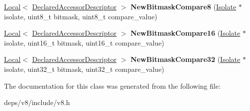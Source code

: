 \begin{DoxyCompactItemize}
\item 
\hypertarget{classv8_1_1_raw_operation_descriptor_a02b9ebd9141b942ee5eaf844837b5a54}{}\hyperlink{classv8_1_1_local}{Local}$<$ \hyperlink{classv8_1_1_declared_accessor_descriptor}{Declared\+Accessor\+Descriptor} $>$ {\bfseries New\+Bitmask\+Compare8} (\hyperlink{classv8_1_1_isolate}{Isolate} $\ast$isolate, uint8\+\_\+t bitmask, uint8\+\_\+t compare\+\_\+value)\label{classv8_1_1_raw_operation_descriptor_a02b9ebd9141b942ee5eaf844837b5a54}

\item 
\hypertarget{classv8_1_1_raw_operation_descriptor_a36f50eb26b4e4fc689d3e77a3a60484d}{}\hyperlink{classv8_1_1_local}{Local}$<$ \hyperlink{classv8_1_1_declared_accessor_descriptor}{Declared\+Accessor\+Descriptor} $>$ {\bfseries New\+Bitmask\+Compare16} (\hyperlink{classv8_1_1_isolate}{Isolate} $\ast$isolate, uint16\+\_\+t bitmask, uint16\+\_\+t compare\+\_\+value)\label{classv8_1_1_raw_operation_descriptor_a36f50eb26b4e4fc689d3e77a3a60484d}

\item 
\hypertarget{classv8_1_1_raw_operation_descriptor_a4dc21ff1a6b8463c1c85db8362bb56a3}{}\hyperlink{classv8_1_1_local}{Local}$<$ \hyperlink{classv8_1_1_declared_accessor_descriptor}{Declared\+Accessor\+Descriptor} $>$ {\bfseries New\+Bitmask\+Compare32} (\hyperlink{classv8_1_1_isolate}{Isolate} $\ast$isolate, uint32\+\_\+t bitmask, uint32\+\_\+t compare\+\_\+value)\label{classv8_1_1_raw_operation_descriptor_a4dc21ff1a6b8463c1c85db8362bb56a3}

\end{DoxyCompactItemize}


The documentation for this class was generated from the following file\+:\begin{DoxyCompactItemize}
\item 
deps/v8/include/v8.\+h\end{DoxyCompactItemize}
